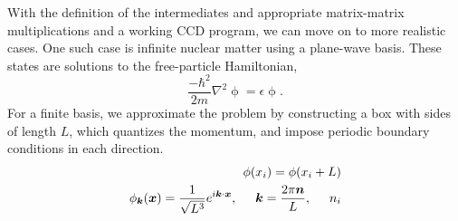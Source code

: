 With the definition of the intermediates and appropriate matrix-matrix multiplications and  a working CCD program, we can move on to more
  realistic cases. One such case is infinite nuclear matter using a
  plane-wave basis. These states are solutions to the free-particle
  Hamiltonian,
  \begin{equation}
  \frac{-\hbar^2}{2m}\nabla^2\mathop{\phi(\vec{x})}=\epsilon\mathop{\phi(\vec{x})}.
  \end{equation}
  For a finite basis, we approximate the problem by constructing a box
  with sides of length $L$, which quantizes the momentum, and impose
  periodic boundary conditions in each direction.
  \begin{align}
  \mathop{\phi(x_{i})}=\mathop{\phi(x_{i}+L)}
  \\ \mathop{\phi_{\vec{k}}(\vec{x})}=\frac{1}{\sqrt{L^{3}}}e^{i\vec{k}\cdot\vec{x}},\hspace{0.5cm}\vec{k}=\frac{2\pi\vec{n}}{L},\hspace{0.5cm}n_{i}
  \end{align}

